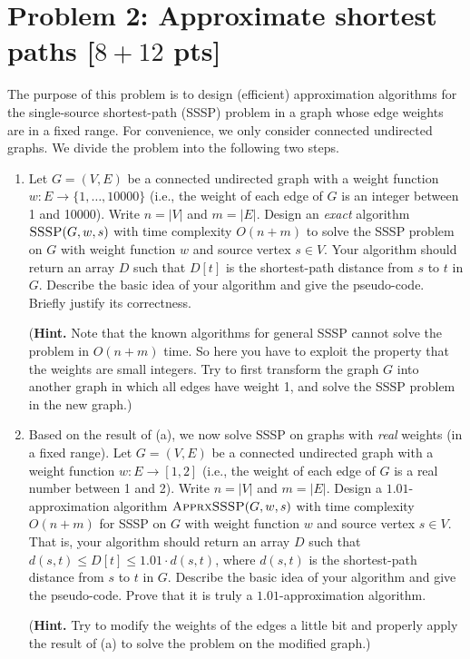 \documentclass[letterpaper, 11pt]{article}
\newcommand{\1}{\mathds{1}}	%
\theoremstyle{definition}
\newcommand{\problem}[1]{\section*{Problem #1}}
\begin{document}
\problem{2: Approximate shortest paths [$8+12$ pts]}
The purpose of this problem is to design (efficient) approximation algorithms for the single-source shortest-path (SSSP) problem in a graph whose edge weights are in a fixed range.
For convenience, we only consider connected undirected graphs.
We divide the problem into the following two steps.
\begin{enumerate}
    \item Let $G = (V,E)$ be a connected undirected graph with a weight function $w:E \rightarrow \{1,\dots,10000\}$ (i.e., the weight of each edge of $G$ is an integer between 1 and 10000). 
    Write $n = |V|$ and $m = |E|$.
    Design an \textit{exact} algorithm $\textsc{SSSP}(G,w,s)$ with time complexity $O(n+m)$ to solve the SSSP problem on $G$ with weight function $w$ and source vertex $s \in V$.
    Your algorithm should return an array $D$ such that $D[t]$ is the shortest-path distance from $s$ to $t$ in $G$.
    Describe the basic idea of your algorithm and give the pseudo-code.
    Briefly justify its correctness.

    (\textbf{Hint.} Note that the known algorithms for general SSSP cannot solve the problem in $O(n+m)$ time.
    So here you have to exploit the property that the weights are small integers.
    Try to first transform the graph $G$ into another graph in which all edges have weight 1, and solve the SSSP problem in the new graph.)
    
    \item Based on the result of (a), we now solve SSSP on graphs with \textit{real} weights (in a fixed range).
    Let $G = (V,E)$ be a connected undirected graph with a weight function $w:E \rightarrow [1,2]$ (i.e., the weight of each edge of $G$ is a real number between 1 and 2). 
    Write $n = |V|$ and $m = |E|$.
    Design a $1.01$-approximation algorithm $\textsc{ApprxSSSP}(G,w,s)$ with time complexity $O(n+m)$ for SSSP on $G$ with weight function $w$ and source vertex $s \in V$.
    That is, your algorithm should return an array $D$ such that $d(s,t) \leq D[t] \leq 1.01 \cdot d(s,t)$, where $d(s,t)$ is the shortest-path distance from $s$ to $t$ in $G$.
    Describe the basic idea of your algorithm and give the pseudo-code.
    Prove that it is truly a $1.01$-approximation algorithm.
    
    (\textbf{Hint.} Try to modify the weights of the edges a little bit and properly apply the result of (a) to solve the problem on the modified graph.)
\end{enumerate}
\end{document}
